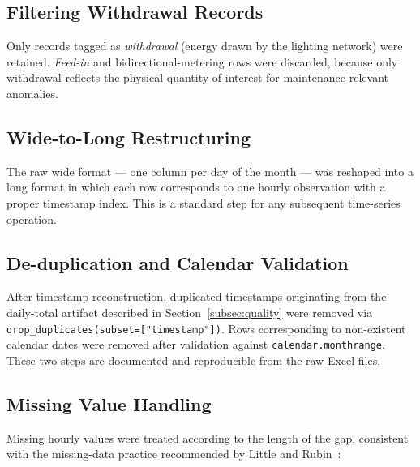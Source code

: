 \documentclass{article}
\begin{document}
\subsection{Filtering Withdrawal Records}
Only records tagged as \emph{withdrawal} (energy drawn by the lighting network) were retained. \emph{Feed-in} and bidirectional-metering rows were discarded, because only withdrawal reflects the physical quantity of interest for maintenance-relevant anomalies.

\subsection{Wide-to-Long Restructuring}
The raw wide format --- one column per day of the month --- was reshaped into a long format in which each row corresponds to one hourly observation with a proper timestamp index. This is a standard step for any subsequent time-series operation.

\subsection{De-duplication and Calendar Validation}
After timestamp reconstruction, duplicated timestamps originating from the daily-total artifact described in Section~\ref{subsec:quality} were removed via \texttt{drop\_duplicates(subset=["timestamp"])}. Rows corresponding to non-existent calendar dates were removed after validation against \texttt{calendar.monthrange}. These two steps are documented and reproducible from the raw Excel files.

\subsection{Missing Value Handling}\label{subsec:missing}
Missing hourly values were treated according to the length of the gap, consistent with the missing-data practice recommended by Little and Rubin~\cite{littlerubin2019}:
\end{document}
